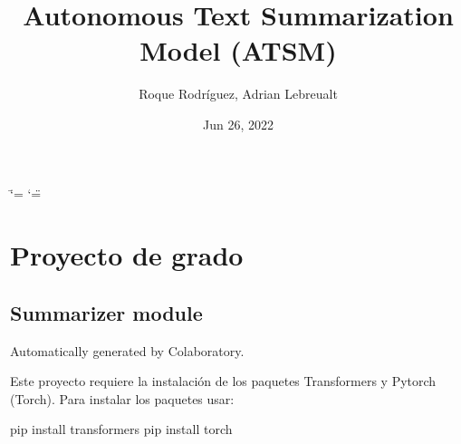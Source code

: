 \documentclass[letterpaper,10pt,english]{sphinxmanual}
\title{Autonomous Text Summarization Model (ATSM)}
\date{Jun 26, 2022}
\author{Roque Rodríguez, Adrian Lebreualt}
\begin{document}
\ifdefined\shorthandoff
  \ifnum\catcode`\=\string=\active\shorthandoff{=}\fi
  \ifnum\catcode`\"=\active{}\fi
\fi

\pagestyle{empty}
\sphinxmaketitle
\pagestyle{plain}
\sphinxtableofcontents
\pagestyle{normal}
\label{\detokenize{index::doc}}


\sphinxstepscope


\chapter{Proyecto de grado}
\label{\detokenize{modules:proyecto-de-grado}}\label{\detokenize{modules::doc}}
\sphinxstepscope


\section{Summarizer module}
\label{\detokenize{Summarizer:module-Summarizer}}\label{\detokenize{Summarizer:summarizer-module}}\label{\detokenize{Summarizer::doc}}
\sphinxAtStartPar
Automatically generated by Colaboratory.
\begin{description}
\sphinxAtStartPar
{}

\end{description}

\sphinxAtStartPar
Este proyecto requiere la instalación de los paquetes Transformers y Pytorch (Torch).
Para instalar los paquetes usar:

\sphinxAtStartPar
pip install transformers
pip install torch
\end{document}
